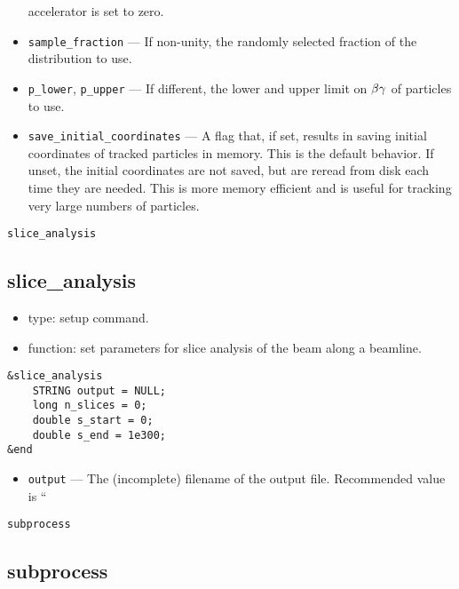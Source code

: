 \documentclass[11pt]{article}
\begin{document}
\begin{itemize}
accelerator is set to zero.
\item \verb|sample_fraction| --- If non-unity, the randomly selected fraction of the distribution to use.
\item \verb|p_lower|, \verb|p_upper| --- If different, the lower and upper limit on ${\rm \beta\gamma}$ of particles to use.
\item \verb|save_initial_coordinates| --- A flag that, if set, results in saving initial coordinates
of tracked particles in memory.  This is the default behavior.  If unset, the initial coordinates
are not saved, but are reread from disk each time they are needed.  This is more memory efficient
and is useful for tracking very large numbers of particles.
\end{itemize}

\begin{latexonly}
\newpage
\begin{center}{\Large\verb|slice_analysis|}\end{center}
\end{latexonly}
\subsection{slice\_analysis}

\begin{itemize}
\item type: setup command.
\item function: set parameters for slice analysis of the beam along a
	beamline.
\end{itemize}

\begin{verbatim}
&slice_analysis
	STRING output = NULL;
	long n_slices = 0;
	double s_start = 0;
	double s_end = 1e300;
&end
\end{verbatim}

\begin{itemize}
\item \verb|output| --- The (incomplete) filename of the output file.
	Recommended value is ``%

\end{itemize}

\begin{latexonly}
\newpage
\begin{center}{\Large\verb|subprocess|}\end{center}
\end{latexonly}
\subsection{subprocess}
\end{document}
